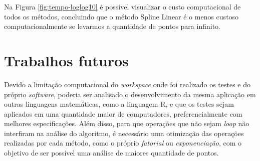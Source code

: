 \documentclass[conference]{IEEEtran}
\begin{document}
Na Figura \ref{fig:tempo-loglog10} é possível visualizar o custo computacional de todos os métodos, concluindo que o método Spline Linear é o menos custoso computacionalmente se levarmos a quantidade de pontos para infinito.
\section{Trabalhos futuros} \label{sec:trabalhosfut}
Devido a limitação computacional do \emph{workspace} onde foi realizado os testes e do próprio \emph{software}, poderia ser analisado o desenvolvimento da mesma aplicação em outras linguagens matemáticas, como a linguagem R, e que os testes sejam aplicados em uma quantidade maior de computadores, preferencialmente com melhores especificações. 
Além disso, para que operações que não sejam \emph{loop} não interfiram na análise do algoritmo, é necessário uma otimização das operações realizadas por cada método, como o próprio \emph{fatorial} ou \emph{exponenciação}, com o objetivo de ser possível uma análise de maiores quantidade de pontos.



\end{document}
